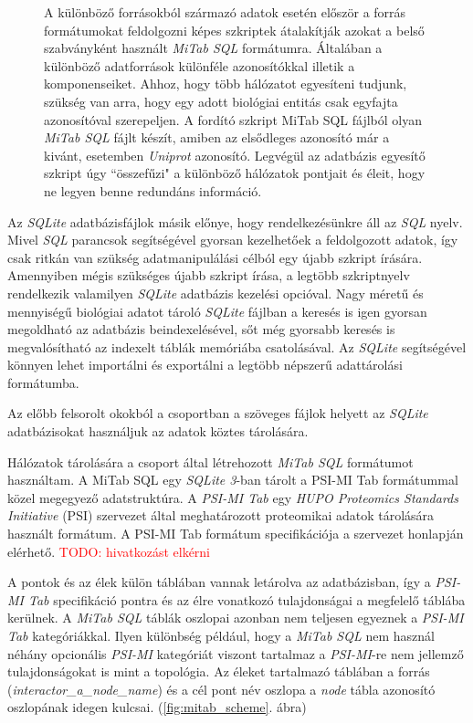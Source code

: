 \documentclass[a4paper,12pt]{article}
\newenvironment{imgdesc}{
		\small
		\singlespacing
		\begin{center}
		
	}{
		\end{center}	
	}
\begin{document}
\begin{figure}[H]
 			 		 \begin{imgdesc}
 				 		 A különböző forrásokból származó adatok esetén először a forrás formátumokat feldolgozni képes szkriptek átalakítják azokat a belső szabványként használt \textit{MiTab SQL} formátumra. Általában a különböző adatforrások különféle azonosítókkal illetik a komponenseiket. Ahhoz, hogy több hálózatot egyesíteni tudjunk, szükség van arra, hogy egy adott biológiai entitás csak egyfajta azonosítóval szerepeljen. A fordító szkript MiTab SQL fájlból olyan \textit{MiTab SQL} fájlt készít, amiben az elsődleges azonosító már a kivánt, esetemben \textit{Uniprot} azonosító. Legvégül az adatbázis egyesítő szkript úgy ``összefűzi" a különböző hálózatok pontjait és éleit, hogy ne legyen benne redundáns információ.
 			 		 \end{imgdesc}

			 		 \label{fig:slk3uml}			 		 
			 	 \end{figure}
			 	 



			
		 Az \textit{SQLite} adatbázisfájlok másik előnye, hogy rendelkezésünkre áll az \textit{SQL} nyelv. Mivel \textit{SQL} parancsok segítségével gyorsan kezelhetőek a feldolgozott adatok, így csak ritkán van szükség adatmanipulálási célból egy újabb szkript írására. Amennyiben mégis szükséges újabb szkript írása, a legtöbb szkriptnyelv rendelkezik valamilyen \textit{SQLite} adatbázis kezelési opcióval. Nagy méretű és mennyiségű biológiai adatot tároló \textit{SQLite} fájlban a keresés is igen gyorsan megoldható az adatbázis beindexelésével, sőt még gyorsabb keresés is megvalósítható az indexelt táblák memóriába csatolásával. Az \textit{SQLite} segítségével könnyen lehet importálni és exportálni a legtöbb népszerű adattárolási formátumba.
			
		Az előbb felsorolt okokból a csoportban a szöveges fájlok helyett az \textit{SQLite} adatbázisokat használjuk az adatok köztes tárolására. 
		
		Hálózatok tárolására a csoport által létrehozott \textit{MiTab SQL} formátumot használtam. A MiTab SQL egy \textit{SQLite 3}-ban tárolt a PSI-MI Tab formátummal közel megegyező adatstruktúra. A \textit{PSI-MI Tab} egy \textit{HUPO Proteomics Standards Initiative} (PSI) szervezet által meghatározott proteomikai adatok tárolására használt formátum. A PSI-MI Tab formátum specifikációja a szervezet honlapján elérhető. \textcolor{red}{TODO: hivatkozást elkérni}
		
		A pontok és az élek külön táblában vannak letárolva az adatbázisban, így a \textit{PSI-MI Tab} specifikáció pontra és az élre vonatkozó tulajdonságai a megfelelő táblába kerülnek. A \textit{MiTab SQL} táblák oszlopai azonban nem teljesen egyeznek a \textit{PSI-MI Tab} kategóriákkal. Ilyen különbség például, hogy a \textit{MiTab SQL} nem használ néhány opcionális \textit{PSI-MI} kategóriát viszont tartalmaz a \textit{PSI-MI}-re nem jellemző tulajdonságokat is mint a topológia. Az éleket tartalmazó táblában a forrás (\textit{interactor\_a\_node\_name}) és a cél pont név oszlopa a \textit{node} tábla azonosító oszlopának idegen kulcsai. (\ref{fig:mitab_scheme}. ábra)
			
\end{document}
